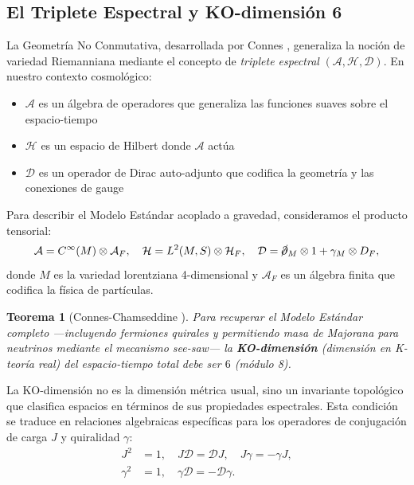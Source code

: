 \documentclass[12pt, a4paper]{article}
\theoremstyle{plain}
\newtheorem{teorema}{Teorema}
\theoremstyle{definition}
\begin{document}
\subsection{El Triplete Espectral y KO-dimensión 6}

La Geometría No Conmutativa, desarrollada por Connes \cite{Connes1996}, generaliza la noción de variedad Riemanniana mediante el concepto de \textit{triplete espectral} $(\mathcal{A}, \mathcal{H}, \mathcal{D})$. En nuestro contexto cosmológico:

\begin{itemize}
    \item $\mathcal{A}$ es un álgebra de operadores que generaliza las funciones suaves sobre el espacio-tiempo
    \item $\mathcal{H}$ es un espacio de Hilbert donde $\mathcal{A}$ actúa
    \item $\mathcal{D}$ es un operador de Dirac auto-adjunto que codifica la geometría y las conexiones de gauge
\end{itemize}

Para describir el Modelo Estándar acoplado a gravedad, consideramos el producto tensorial:
\begin{equation}
\mathcal{A} = C^\infty(M) \otimes \mathcal{A}_F, \quad 
\mathcal{H} = L^2(M, S) \otimes \mathcal{H}_F, \quad 
\mathcal{D} = \cancel{\partial}_M \otimes 1 + \gamma_M \otimes D_F,
\end{equation}
donde $M$ es la variedad lorentziana 4-dimensional y $\mathcal{A}_F$ es un álgebra finita que codifica la física de partículas.

\begin{teorema}[Connes-Chamseddine \cite{Connes2008}]
Para recuperar el Modelo Estándar completo —incluyendo fermiones quirales y permitiendo masa de Majorana para neutrinos mediante el mecanismo \textit{see-saw}— la \textbf{KO-dimensión} (dimensión en K-teoría real) del espacio-tiempo total debe ser $6$ (módulo 8).
\end{teorema}

La KO-dimensión no es la dimensión métrica usual, sino un invariante topológico que clasifica espacios en términos de sus propiedades espectrales. Esta condición se traduce en relaciones algebraicas específicas para los operadores de conjugación de carga $J$ y quiralidad $\gamma$:
\begin{align}
    J^2 &= 1, \quad J\mathcal{D} = \mathcal{D}J, \quad J\gamma = -\gamma J, \\
    \gamma^2 &= 1, \quad \gamma\mathcal{D} = -\mathcal{D}\gamma.
\end{align}
\end{document}
